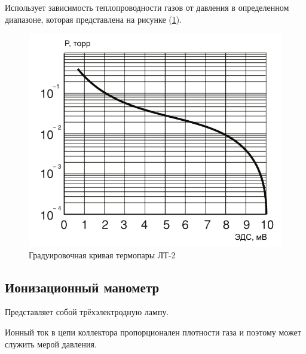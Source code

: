 \documentclass[a4paper,12pt]{article} %
\begin{document}
Использует зависимость теплопроводности газов от давления в определенном диапазоне, которая представлена на рисунке (\ref{fig:thermo}).

\begin{figure}[h!]
  \centering
  \includegraphics[scale = 0.5]{thermo.png}
  \caption{Градуировочная кривая термопары ЛТ-2}
  \label{fig:thermo}
\end{figure}

\subsection*{Ионизационный манометр}

Представляет собой трёхэлектродную лампу.

Ионный ток в цепи коллектора пропорционален плотности газа и поэтому может служить мерой давления.
\end{document}
